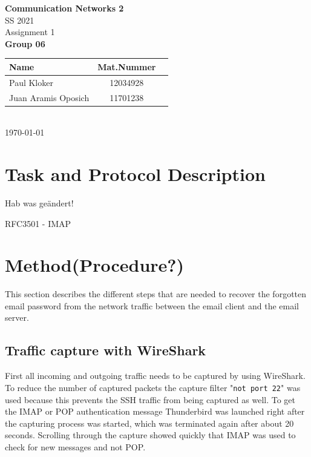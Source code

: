 \documentclass[parskip=full]{scrartcl}
\begin{document}
\begin{titlepage}
    \centering
    \vspace*{2cm}
    {\Huge \textbf{Communication Networks 2}}\\
    SS 2021\\
    \vspace*{1cm}
    {\Large Assignment 1}
    \\\vspace*{3cm}
    {\Large \textbf{Group 06}}\\
    \vspace*{1cm}
    {\large 
        \begin{tabular}{l c c}
            Name & Mat.Nummer \\ \hline
            Paul Kloker & 12034928 \\
            Juan Aramis Oposich & 11701238
        \end{tabular}
    }
    \\\vspace*{7cm}
    \today
\end{titlepage}

\section{Task and Protocol Description}

Hab was geändert!

RFC3501 - IMAP


\section{Method(Procedure?)}
This section describes the different steps that are needed to recover the forgotten email password from the network traffic between the email client and the email server. 
\subsection{Traffic capture with WireShark}
First all incoming and outgoing traffic needs to be captured by using WireShark. To reduce the number of captured packets the capture filter "\verb|not port 22|" was used because this prevents the SSH traffic from being captured as well. To get the IMAP or POP authentication message Thunderbird was launched right after the capturing process was started, which was terminated again after about 20 seconds. Scrolling through the capture showed quickly that IMAP was used to check for new messages and not POP.
\end{document}
